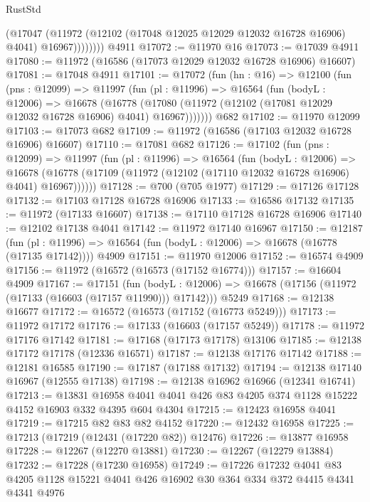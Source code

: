 \begin{lexlean}{RustStd}
\begin{coremodule}
                (@17047
                  (@11972 (@12102 (@17048 @12025 @12029 @12032 @16728 @16906) @4041) @16967))))))))
    @4911
@17072 := @11970 @16
@17073 := @17039 @4911
@17080 := @11972 (@16586 (@17073 @12029 @12032 @16728 @16906) @16607)
@17081 := @17048 @4911
@17101 := @17072
    (fun (hn : @16) =>
    @12100
      (fun (pns : @12099) =>
      @11997
        (fun (pl : @11996) =>
        @16564
          (fun (bodyL : @12006) =>
          @16678
            (@16778
              (@17080 (@11972 (@12102 (@17081 @12029 @12032 @16728 @16906) @4041) @16967)))))))
    @682
@17102 := @11970 @12099
@17103 := @17073 @682
@17109 := @11972 (@16586 (@17103 @12032 @16728 @16906) @16607)
@17110 := @17081 @682
@17126 := @17102
    (fun (pns : @12099) =>
    @11997
      (fun (pl : @11996) =>
      @16564
        (fun (bodyL : @12006) =>
        @16678 (@16778 (@17109 (@11972 (@12102 (@17110 @12032 @16728 @16906) @4041) @16967))))))
@17128 := @700 (@705 @1977)
@17129 := @17126 @17128
@17132 := @17103 @17128 @16728 @16906
@17133 := @16586 @17132
@17135 := @11972 (@17133 @16607)
@17138 := @17110 @17128 @16728 @16906
@17140 := @12102 @17138 @4041
@17142 := @11972 @17140 @16967
@17150 := @12187
    (fun (pl : @11996) => @16564 (fun (bodyL : @12006) => @16678 (@16778 (@17135 @17142))))
    @4909
@17151 := @11970 @12006
@17152 := @16574 @4909
@17156 := @11972 (@16572 (@16573 (@17152 @16774)))
@17157 := @16604 @4909
@17167 := @17151
    (fun (bodyL : @12006) => @16678 (@17156 (@11972 (@17133 (@16603 (@17157 @11990))) @17142)))
    @5249
@17168 := @12138 @16677
@17172 := @16572 (@16573 (@17152 (@16773 @5249)))
@17173 := @11972 @17172
@17176 := @17133 (@16603 (@17157 @5249))
@17178 := @11972 @17176 @17142
@17181 := @17168 (@17173 @17178) @13106
@17185 := @12138 @17172 @17178 (@12336 @16571)
@17187 := @12138 @17176 @17142
@17188 := @12181 @16585
@17190 := @17187 (@17188 @17132)
@17194 := @12138 @17140 @16967 (@12555 @17138)
@17198 := @12138 @16962 @16966 (@12341 @16741)
@17213 := @13831
    @16958
    @4041
    @4041
    @426
    @83
    @4205
    @374
    @1128
    @15222
    @4152
    @16903
    @332
    @4395
    @604
    @4304
@17215 := @12423 @16958 @4041
@17219 := @17215 @82 @83 @82 @4152
@17220 := @12432 @16958
@17225 := @17213 (@17219 (@12431 (@17220 @82)) @12476)
@17226 := @13877 @16958
@17228 := @12267 (@12270 @13881)
@17230 := @12267 (@12279 @13884)
@17232 := @17228 (@17230 @16958)
@17249 := @17226
    @17232
    @4041
    @83
    @4205
    @1128
    @15221
    @4041
    @426
    @16902
    @30
    @364
    @334
    @372
    @4415
    @4341
    @4341
    @4976

\end{coremodule}
\end{lexlean}
